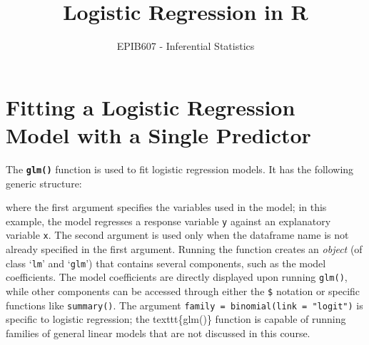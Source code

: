 \documentclass[letterpaper,12pt,twoside,]{pinp}
\title{Logistic Regression in R}
\author[a]{EPIB607 - Inferential Statistics}
\affil[a]{Fall 2020, McGill University}
\begin{document}
\verticaladjustment{-2pt}

\maketitle
\thispagestyle{firststyle}



\hypertarget{fitting-a-logistic-regression-model-with-a-single-predictor}{%
\section{Fitting a Logistic Regression Model with a Single
Predictor}\label{fitting-a-logistic-regression-model-with-a-single-predictor}}

The \textbf{\texttt{glm()}} function is used to fit logistic regression
models. It has the following generic structure:

\begin{Shaded}
\begin{Highlighting}[]
\OperatorTok{~}\StringTok{ } \NormalTok{(} \NormalTok{))}
\end{Highlighting}
\end{Shaded}

where the first argument specifies the variables used in the model; in
this example, the model regresses a response variable \texttt{y} against
an explanatory variable \texttt{x}. The second argument is used only
when the dataframe name is not already specified in the first argument.
Running the function creates an \emph{object} (of class `\texttt{lm}'
and `\texttt{glm}') that contains several components, such as the model
coefficients. The model coefficients are directly displayed upon running
\texttt{glm()}, while other components can be accessed through either
the \texttt{\$} notation or specific functions like \texttt{summary()}.
The argument \texttt{family = binomial(link = "logit")} is specific to
logistic regression; the texttt\{glm()\} function is capable of running
families of general linear models that are not discussed in this course.
\end{document}

